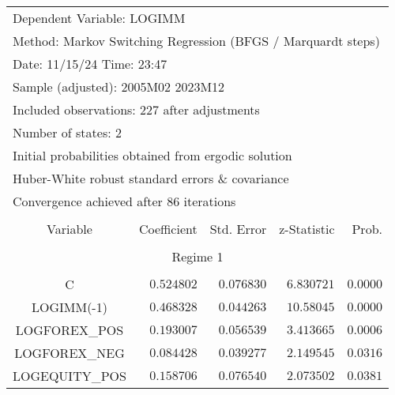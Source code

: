 \begin{tabular}{lrrrr}
\multicolumn{2}{l}{Dependent Variable: LOGIMM}&\multicolumn{1}{c}{}&\multicolumn{1}{c}{}&\multicolumn{1}{c}{}\\
\multicolumn{5}{l}{Method: Markov Switching Regression (BFGS / Marquardt steps)}\\
\multicolumn{2}{l}{Date: 11/15/24   Time: 23:47}&\multicolumn{1}{c}{}&\multicolumn{1}{c}{}&\multicolumn{1}{c}{}\\
\multicolumn{3}{l}{Sample (adjusted): 2005M02 2023M12}&\multicolumn{1}{c}{}&\multicolumn{1}{c}{}\\
\multicolumn{4}{l}{Included observations: 227 after adjustments}&\multicolumn{1}{c}{}\\
\multicolumn{1}{l}{Number of states: 2}&\multicolumn{1}{c}{}&\multicolumn{1}{c}{}&\multicolumn{1}{c}{}&\multicolumn{1}{c}{}\\
\multicolumn{4}{l}{Initial probabilities obtained from ergodic solution}&\multicolumn{1}{c}{}\\
\multicolumn{4}{l}{Huber-White robust standard errors \& covariance}&\multicolumn{1}{c}{}\\
\multicolumn{3}{l}{Convergence achieved after 86 iterations}&\multicolumn{1}{c}{}&\multicolumn{1}{c}{}\\
[4.5pt] \hline \\ [-4.5pt]
\multicolumn{1}{c}{Variable}&\multicolumn{1}{r}{Coefficient}&\multicolumn{1}{r}{Std. Error}&\multicolumn{1}{r}{z-Statistic}&\multicolumn{1}{r}{Prob.}\\
[4.5pt] \hline \\ [-4.5pt]
\multicolumn{5}{c}{Regime 1}\\
[4.5pt] \hline \\ [-4.5pt]
\multicolumn{1}{c}{C}&\multicolumn{1}{r}{$0.524802$}&\multicolumn{1}{r}{$0.076830$}&\multicolumn{1}{r}{$6.830721$}&\multicolumn{1}{r}{$0.0000$}\\
\multicolumn{1}{c}{LOGIMM(-1)}&\multicolumn{1}{r}{$0.468328$}&\multicolumn{1}{r}{$0.044263$}&\multicolumn{1}{r}{$10.58045$}&\multicolumn{1}{r}{$0.0000$}\\
\multicolumn{1}{c}{LOGFOREX\_POS}&\multicolumn{1}{r}{$0.193007$}&\multicolumn{1}{r}{$0.056539$}&\multicolumn{1}{r}{$3.413665$}&\multicolumn{1}{r}{$0.0006$}\\
\multicolumn{1}{c}{LOGFOREX\_NEG}&\multicolumn{1}{r}{$0.084428$}&\multicolumn{1}{r}{$0.039277$}&\multicolumn{1}{r}{$2.149545$}&\multicolumn{1}{r}{$0.0316$}\\
\multicolumn{1}{c}{LOGEQUITY\_POS}&\multicolumn{1}{r}{$0.158706$}&\multicolumn{1}{r}{$0.076540$}&\multicolumn{1}{r}{$2.073502$}&\multicolumn{1}{r}{$0.0381$}\\

\end{tabular}
